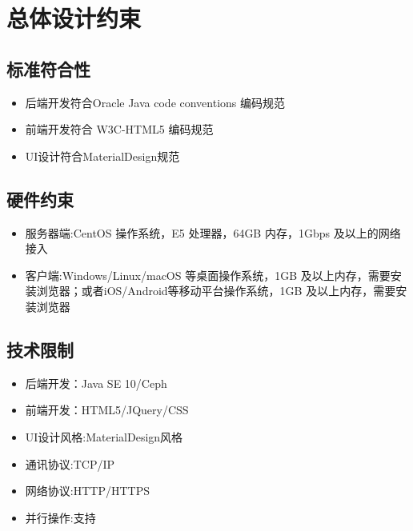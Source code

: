 \chapter{总体设计约束}
 
\section{标准符合性}
\begin{itemize}
  \item 后端开发符合Oracle Java code conventions 编码规范
  \item 前端开发符合 W3C-HTML5 编码规范
  \item UI设计符合MaterialDesign规范
\end{itemize}

\section{硬件约束}
\begin{itemize}
  \item 服务器端:CentOS 操作系统，E5 处理器，64GB 内存，1Gbps 及以上的网络接入 
  \item 客户端:Windows/Linux/macOS 等桌面操作系统，1GB 及以上内存，需要安装浏览器；或者iOS/Android等移动平台操作系统，1GB 及以上内存，需要安装浏览器
\end{itemize}

\section{技术限制}
\begin{itemize}
  \item 后端开发：Java SE 10/Ceph
  \item 前端开发：HTML5/JQuery/CSS
  \item UI设计风格:MaterialDesign风格
  \item 通讯协议:TCP/IP
  \item 网络协议:HTTP/HTTPS
  \item 并行操作:支持
\end{itemize}